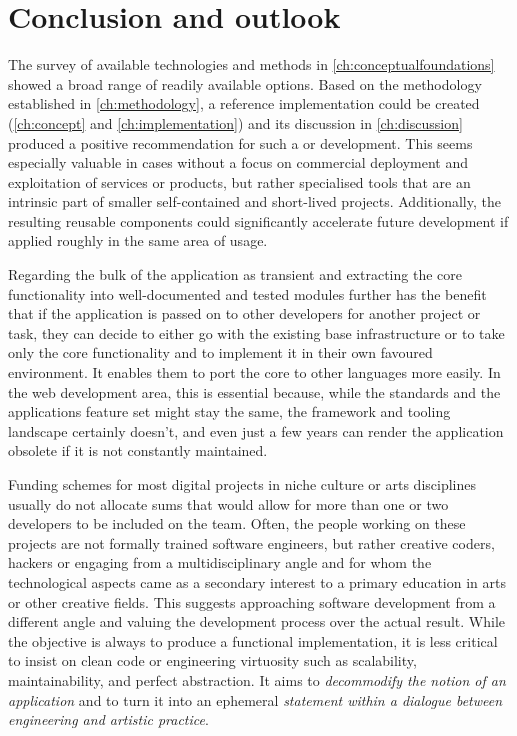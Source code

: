 \chapter{Conclusion and outlook}
\label{ch:conclusion-and-outlook}

The survey of available technologies and methods in \autoref{ch:conceptualfoundations} showed a broad range of readily available options.
Based on the methodology established in \autoref{ch:methodology}, a reference implementation could be created (\autoref{ch:concept} and \autoref{ch:implementation}) and its discussion in \autoref{ch:discussion} produced a positive recommendation for such a  or  development.
This seems especially valuable in cases without a focus on commercial deployment and exploitation of services or products, but rather specialised tools that are an intrinsic part of smaller self-contained and short-lived projects.
Additionally, the resulting reusable components could significantly accelerate future development if applied roughly in the same area of usage.

Regarding the bulk of the application as transient and extracting the core functionality into well-documented and tested modules further has the benefit that if the application is passed on to other developers for another project or task, they can decide to either go with the existing base infrastructure or to take only the core functionality and to implement it in their own favoured environment.
It enables them to port the core to other languages more easily.
In the web development area, this is essential because, while the standards and the application\textquotesingle s feature set might stay the same, the framework and tooling landscape certainly doesn't, and even just a few years can render the application obsolete if it is not constantly maintained.

Funding schemes for most digital projects in niche culture or arts disciplines usually do not allocate sums that would allow for more than one or two developers to be included on the team.
Often, the people working on these projects are not formally trained software engineers, but rather creative coders, hackers or engaging from a multidisciplinary angle and for whom the technological aspects came as a secondary interest to a primary education in arts or other creative fields.
This suggests approaching software development from a different angle and valuing the development process over the actual result.
While the objective is always to produce a functional implementation, it is less critical to insist on clean code or engineering virtuosity such as scalability, maintainability, and perfect abstraction.
It aims to \emph{decommodify the notion of an application} and to turn it into an ephemeral \emph{statement within a dialogue between engineering and artistic practice}.

